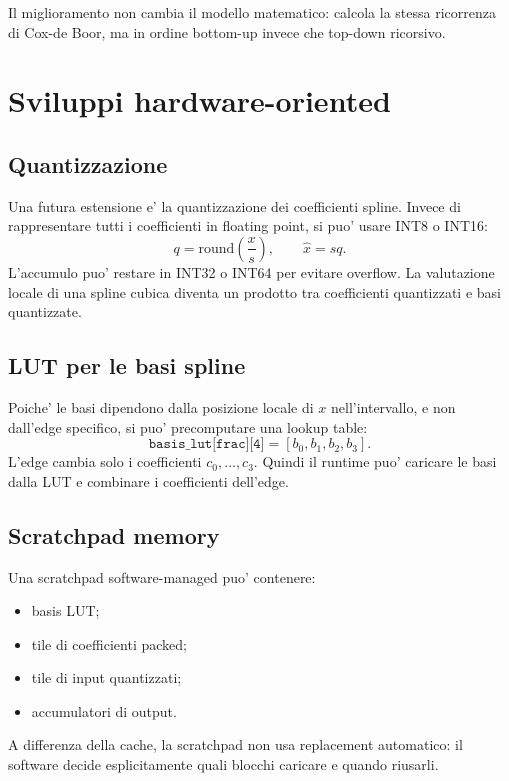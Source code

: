 \documentclass[conference]{IEEEtran}
\begin{document}
Il miglioramento non cambia il modello matematico: calcola la stessa ricorrenza di Cox-de Boor, ma in ordine bottom-up invece che top-down ricorsivo.

\section{Sviluppi hardware-oriented}
\subsection{Quantizzazione}
Una futura estensione e' la quantizzazione dei coefficienti spline. Invece di rappresentare tutti i coefficienti in floating point, si puo' usare INT8 o INT16:
\begin{equation}
    q = \mathrm{round}\left(\frac{x}{s}\right), \qquad \hat{x}=s q.
\end{equation}
L'accumulo puo' restare in INT32 o INT64 per evitare overflow. La valutazione locale di una spline cubica diventa un prodotto tra coefficienti quantizzati e basi quantizzate.

\subsection{LUT per le basi spline}
Poiche' le basi dipendono dalla posizione locale di $x$ nell'intervallo, e non dall'edge specifico, si puo' precomputare una lookup table:
\begin{equation}
    \texttt{basis\_lut[frac][4]} = [b_0,b_1,b_2,b_3].
\end{equation}
L'edge cambia solo i coefficienti $c_0,\ldots,c_3$. Quindi il runtime puo' caricare le basi dalla LUT e combinare i coefficienti dell'edge.

\subsection{Scratchpad memory}
Una scratchpad software-managed puo' contenere:
\begin{itemize}
    \item basis LUT;
    \item tile di coefficienti packed;
    \item tile di input quantizzati;
    \item accumulatori di output.
\end{itemize}
A differenza della cache, la scratchpad non usa replacement automatico: il software decide esplicitamente quali blocchi caricare e quando riusarli.
\end{document}
